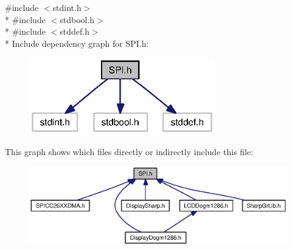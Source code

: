 {\ttfamily \#include $<$stdint.\+h$>$}\\*
{\ttfamily \#include $<$stdbool.\+h$>$}\\*
{\ttfamily \#include $<$stddef.\+h$>$}\\*
Include dependency graph for S\+P\+I.\+h\+:
\nopagebreak
\begin{figure}[H]
\begin{center}
\leavevmode
\includegraphics[width=229pt]{_s_p_i_8h__incl}
\end{center}
\end{figure}
This graph shows which files directly or indirectly include this file\+:
\nopagebreak
\begin{figure}[H]
\begin{center}
\leavevmode
\includegraphics[width=350pt]{_s_p_i_8h__dep__incl}
\end{center}
\end{figure}
